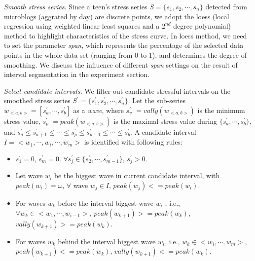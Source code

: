 \emph{Smooth stress series}.
Since a teen's stress series $S=\{s_1, s_2, \cdots, s_n\}$ detected from microblogs (aggrated by day) are discrete points,
we adopt the loess (local regression using weighted linear least squares and a $2^{nd}$ degree polynomial) method \cite{Cleveland1988Locally} to highlight characteristics of the stress curve.
In loess method, we need to set the parameter \emph{span},
which represents the percentage of the selected data points in the whole data set (ranging from 0 to 1),
and determines the degree of smoothing.
We discuss the influence of different \emph{span} settings on the result of interval segmentation in the experiment section.

\emph{Select candidate intervals.}
We filter out candidate stressful intervals on the smoothed stress series $S^{'}=\{s^{'}_1,s^{'}_2,\cdots,s^{'}_n\}$.
Let the sub-series $w_{<a,b>} = [s^{'}_a, \cdots, s^{'}_b]$ as a \emph{wave},
where $s^{'}_v$ $= {vally(w_{<a,b>})}$ is the minimum stress value,
$s^{'}_p$ $= peak(w_{<a,b>})$ is the maximal stress value during $\{s^{'}_a,\cdots,s^{'}_b\}$,
and $s^{'}_a \leq s^{'}_{a+1} \leq \cdots \leq s^{'}_p \leq s^{'}_{p+1} \leq \cdots \leq s^{'}_b$.
A candidate interval $I = <w_1,\cdots, w_i,\cdots, w_m>$ is identified with following rules:
\begin{itemize}
\item $s^{'}_1 = 0$, $s^{'}_m = 0$. $\forall s^{'}_j \in \{s^{'}_2,\cdots,s^{'}_{m-1}\}$, $s^{'}_j > 0$.
\item Let wave $w_i$ be the biggest wave in current candidate interval, with $peak(w_i) = \omega$,
$\forall $ wave $w_j \in I$, $peak(w_j)<=peak(w_i)$.
\item For waves $w_k$ before the interval biggest wave $w_i$ , i.e., $\forall w_k \in <w_1,\cdots,w_{i-1}>$,
$peak(w_{k+1})>=peak(w_k)$, $vally(w_{k+1}) >= peak(w_k)$.
\item For waves $w_k$ behind the interval biggest wave $w_i$, i.e.,  $w_k \in <w_{i}, \cdots, w_m>$,
$peak(w_{k+1})<=peak(w_k)$, $vally(w_{k+1}) <= peak(w_k)$.
\end{itemize}

